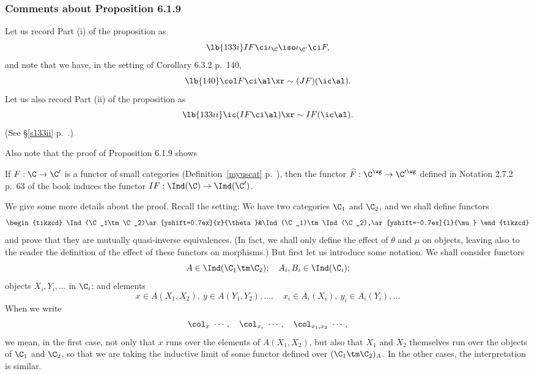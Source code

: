 \documentclass[12pt]{article}
\theoremstyle{remark}
\theoremstyle{definition}
\begin{document}
\subsubsection{Comments about Proposition 6.1.9} 

Let us record Part (i) of the proposition as 
\begin{equation}\lb{133i}
IF\ci\iota_\C\iso\iota_{\C'}\ci F, 
\end{equation} 
and note that we have, in the setting of Corollary 6.3.2 p.~140, 
\begin{equation}\lb{140}
\col F\ci\al\xr\sim(JF)(\ic\al).
\end{equation} 
Let us also record Part (ii) of the proposition as 
\begin{equation}\lb{133ii}
\ic(IF\ci\al)\xr\sim IF(\ic\al).
\end{equation} 
(See \S\ref{s133ii} p.~.)

Also note that the proof of Proposition 6.1.9 shows

\begin{prop}
If $F:\C\to\C'$ is a functor of small categories (Definition~\ref{myuscat} p.~), then the functor $\widehat F:\C^\wg\to\C'^\wg$ defined in Notation 2.7.2 p.~63 of the book induces the functor $IF:\Ind(\C)\to\Ind(\C')$.
\end{prop}



We give some more details about the proof. Recall the setting: We have two categories $\C_1$ and $\C_2$, and we shall define functors
$$
\begin{tikzcd}
\Ind(\C_1\tm\C_2)\ar[yshift=0.7ex]{r}{\theta}&\Ind(\C_1)\tm\Ind(\C_2),\ar[yshift=-0.7ex]{l}{\mu}
\end{tikzcd}
$$ 
and prove that they are mutually quasi-inverse equivalences. (In fact, we shall only define the effect of $\theta$ and $\mu$ on objects, leaving also to the reader the definition of the effect of these functors on morphisms.) But first let us introduce some notation. We shall consider functors 
$$
A\in\Ind(\C_1\tm\C_2);\quad A_i,B_i\in\Ind(\C_i);
$$ 
objects $X_i,Y_i,\dots$ in $\C_i$; and elements 
$$
x\in A(X_1,X_2),\ y\in A(Y_1,Y_2),\dots,\quad x_i\in A_i(X_i),\ y_i\in A_i(Y_i),\dots
$$ 
When we write 
$$
\col_x\ \cdots,\quad\col_{x_i}\ \cdots,\quad\col_{x_1,x_2}\ \cdots,
$$ 
we mean, in the first case, not only that $x$ runs over the elements of $A(X_1,X_2)$, but also that $X_1$ and $X_2$ themselves run over the objects of $\C_1$ and $\C_2$, so that we are taking the inductive limit of some functor defined over $(\C_1\tm\C_2)_A$. In the other cases, the interpretation is similar. 
\end{document}
